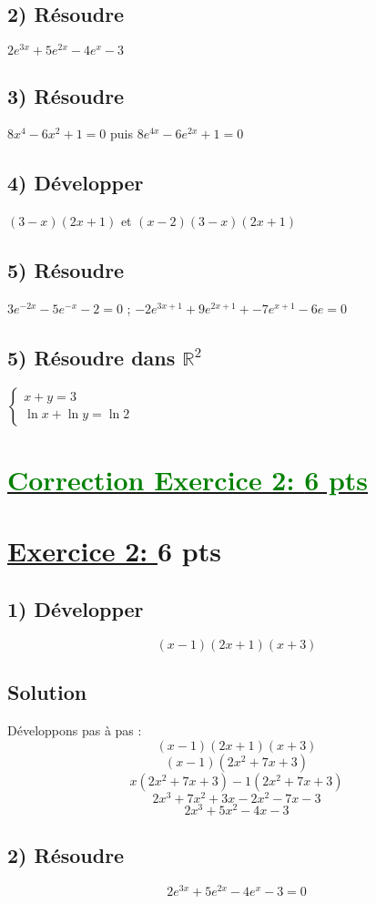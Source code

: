 \documentclass[12pt]{article}
\begin{document}
\subsection*{ 2) Résoudre } $2e^{3x}+5e^{2x}-4e^{x}-3$
\subsection*{ 3) Résoudre } $8x^{4}-6x^{2}+1=0$ puis $8e^{4x}-6e^{2x}+1=0$
\subsection*{ 4) Développer } $(3-x)(2x+1)$ et $(x-2)(3-x)(2x+1)$
\subsection*{ 5) Résoudre } $3e^{-2x}-5e^{-x}-2=0$ ; $-2e^{3x+1}+9e^{2x+1}+-7e^{x+1}-6e=0$
\subsection*{ 5) Résoudre dans $\mathbb{R}^{2}$} 
\( \begin{cases}
x + y = 3 \\
\ln x + \ln y = \ln 2
\end{cases}\)
\section*{\underline{\textcolor{green}{Correction Exercice 2: \textbf{6 pts}}}}

\section*{\underline{Exercice 2: }\textbf{6 pts}}

\subsection*{1) Développer } 
\[
(x-1)(2x+1)(x+3)
\]

\subsection*{Solution}
Développons pas à pas :
\[
(x-1)(2x+1)(x+3)
\]
\[
(x-1)(2x^2 + 7x + 3)
\]
\[
x(2x^2 + 7x + 3) - 1(2x^2 + 7x + 3)
\]
\[
2x^3 + 7x^2 + 3x - 2x^2 - 7x - 3
\]
\[
2x^3 + 5x^2 - 4x - 3
\]

\subsection*{2) Résoudre } 
\[
2e^{3x}+5e^{2x}-4e^{x}-3 = 0
\]
\end{document}
